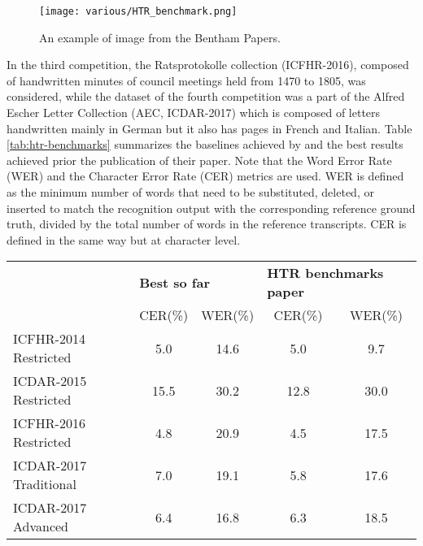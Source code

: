 \begin{figure}[h]
	\caption{An example of image from the Bentham Papers.}
	\centering
	\texttt{[image: various/HTR\_benchmark.png]}
	\label{fig:HTRbenchmark}
\end{figure}

In the third competition, the Ratsprotokolle collection (ICFHR-2016), composed of handwritten minutes of council meetings held from 1470 to 1805, was considered, while the dataset of the fourth competition was a part of the Alfred Escher Letter Collection (AEC, ICDAR-2017) which is composed of letters handwritten mainly in German but it also has pages in French and Italian. Table \ref{tab:htr-benchmarks} summarizes the baselines achieved by \cite{Sanchez2019-pi} and the best results achieved prior the publication of their paper. Note that the Word Error Rate (WER) and the Character Error Rate (CER) metrics are used. WER is defined as the minimum number of words that need to be substituted, deleted, or inserted to match the recognition output with the corresponding reference ground truth, divided by the total number of words in the reference transcripts. CER is defined in the same way but at character level.

\begin{table*}[h]
	\begin{tabular}{lcccc}
		\rowcolor[HTML]{EFEFEF}
		\cellcolor[HTML]{EFEFEF}                                     & \multicolumn{2}{l}{\cellcolor[HTML]{EFEFEF}\textbf{Best so far}} & \multicolumn{2}{l}{\cellcolor[HTML]{EFEFEF}\textbf{HTR benchmarks paper}} \\
		\rowcolor[HTML]{EFEFEF}
		\multirow{-2}{*}{\cellcolor[HTML]{EFEFEF}\textbf{Benchmark}} & CER(\%)                         & WER(\%)                        & CER(\%)                             & WER(\%)                             \\
		ICFHR-2014 Restricted                                        & 5.0                             & 14.6                           & 5.0                                 & 9.7                                 \\
		ICDAR-2015 Restricted                                        & 15.5                            & 30.2                           & 12.8                                & 30.0                                \\
		ICFHR-2016 Restricted                                        & 4.8                             & 20.9                           & 4.5                                 & 17.5                                \\
		ICDAR-2017 Traditional                                       & 7.0                             & 19.1                           & 5.8                                 & 17.6                                \\
		ICDAR-2017 Advanced                                          & 6.4                             & 16.8                           & 6.3                                 & 18.5
	\end{tabular}
	\caption{Benchmarks on handwritten text recognition from \cite{Sanchez2019-pi}.}
	\label{tab:htr-benchmarks}
\end{table*}

